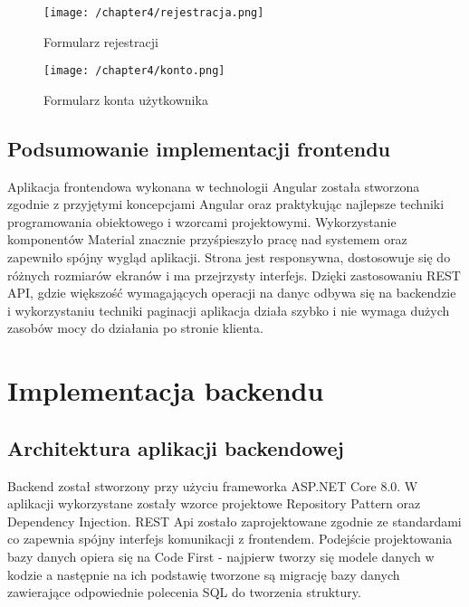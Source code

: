 \begin{figure}[!htb]
	\centering
	\texttt{[image: /chapter4/rejestracja.png]}
	\caption{Formularz rejestracji}
	\label{fig:rejestracja}
\end{figure}

\begin{figure}[!htb]
	\centering
	\texttt{[image: /chapter4/konto.png]}
	\caption{Formularz konta użytkownika}
	\label{fig:konto}
\end{figure}

\subsection{Podsumowanie implementacji frontendu}

Aplikacja frontendowa wykonana w technologii Angular została stworzona zgodnie z przyjętymi koncepcjami Angular oraz praktykując najlepsze techniki programowania obiektowego i wzorcami projektowymi. Wykorzystanie komponentów Material znacznie przyśpieszyło pracę nad systemem oraz zapewniło spójny wygląd aplikacji. Strona jest responsywna, dostosowuje się do różnych rozmiarów ekranów i ma przejrzysty interfejs. Dzięki zastosowaniu REST API, gdzie większość wymagających operacji na danyc odbywa się na backendzie i wykorzystaniu techniki paginacji aplikacja działa szybko i nie wymaga dużych zasobów mocy do działania po stronie klienta.

\FloatBarrier

\section{Implementacja backendu}

\subsection{Architektura aplikacji backendowej}
Backend został stworzony przy użyciu frameworka ASP.NET Core 8.0. W aplikacji wykorzystane zostały wzorce projektowe Repository Pattern oraz Dependency Injection. REST Api zostało zaprojektowane zgodnie ze standardami co zapewnia spójny interfejs komunikacji z frontendem. Podejście projektowania bazy danych opiera się na Code First - najpierw tworzy się modele danych w kodzie a następnie na ich podstawię tworzone są migrację bazy danych zawierające odpowiednie polecenia SQL do tworzenia struktury.


